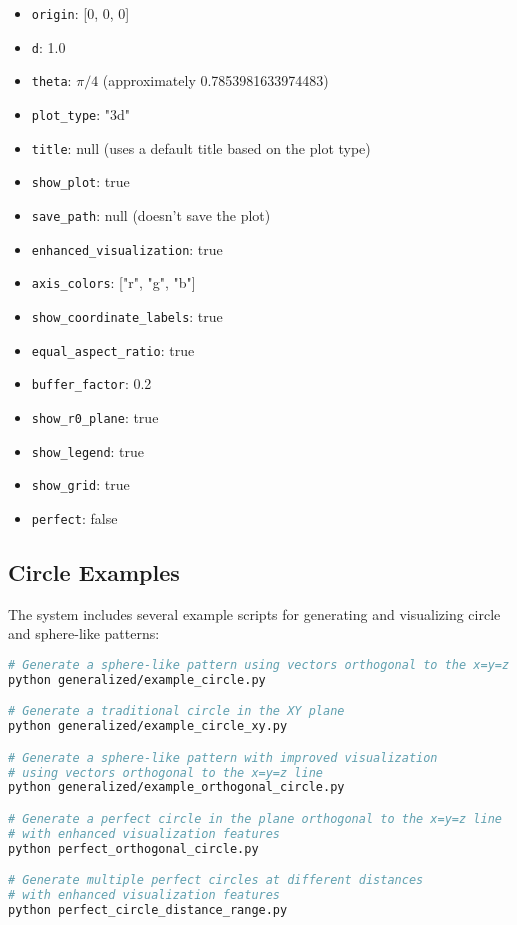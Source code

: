 \begin{itemize}
    \item \texttt{origin}: [0, 0, 0]
    \item \texttt{d}: 1.0
    \item \texttt{theta}: $\pi/4$ (approximately 0.7853981633974483)
    \item \texttt{plot\_type}: "3d"
    \item \texttt{title}: null (uses a default title based on the plot type)
    \item \texttt{show\_plot}: true
    \item \texttt{save\_path}: null (doesn't save the plot)
    \item \texttt{enhanced\_visualization}: true
    \item \texttt{axis\_colors}: ["r", "g", "b"]
    \item \texttt{show\_coordinate\_labels}: true
    \item \texttt{equal\_aspect\_ratio}: true
    \item \texttt{buffer\_factor}: 0.2
    \item \texttt{show\_r0\_plane}: true
    \item \texttt{show\_legend}: true
    \item \texttt{show\_grid}: true
    \item \texttt{perfect}: false
\end{itemize}

\subsection{Circle Examples}

The system includes several example scripts for generating and visualizing circle and sphere-like patterns:

\begin{lstlisting}[language=bash]
# Generate a sphere-like pattern using vectors orthogonal to the x=y=z line
python generalized/example_circle.py

# Generate a traditional circle in the XY plane
python generalized/example_circle_xy.py

# Generate a sphere-like pattern with improved visualization
# using vectors orthogonal to the x=y=z line
python generalized/example_orthogonal_circle.py

# Generate a perfect circle in the plane orthogonal to the x=y=z line
# with enhanced visualization features
python perfect_orthogonal_circle.py

# Generate multiple perfect circles at different distances
# with enhanced visualization features
python perfect_circle_distance_range.py
\end{lstlisting}

